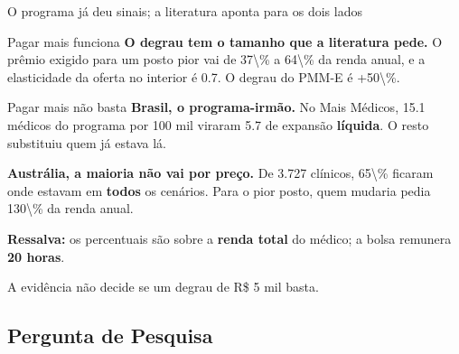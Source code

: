 \documentclass[aspectratio=169,10pt]{beamer}
\begin{document}
\begin{frame}{O programa já deu sinais; a literatura aponta para os dois lados}
{\begin{pmmeduas}
\begin{pmmeparte}{Pagar mais funciona}
        \vspace{0.15em}
        \textbf{O degrau tem o tamanho que a literatura pede.} O prêmio exigido
        para um posto pior vai de \num{37\% a 64\%} da renda anual, e a
        elasticidade da oferta no interior é \num{0,7}. O degrau do PMM-E é
        \num{+50\%}.
      \end{pmmeparte}
      \begin{pmmeparte}{Pagar mais não basta}
        \footnotesize\linespread{0.92}\selectfont
        \textbf{Brasil, o programa-irmão.} No Mais Médicos, \num{+15,1} médicos
        do programa por 100 mil viraram \num{+5,7} de expansão \textbf{líquida}.
        O resto substituiu quem já estava lá.

        \vspace{0.15em}
        \textbf{Austrália, a maioria não vai por preço.} De 3.727 clínicos,
        \num{65\%} ficaram onde estavam em \textbf{todos} os cenários. Para o
        pior posto, quem mudaria pedia \num{130\%} da renda anual.
      \end{pmmeparte}
    \end{pmmeduas}

    \vspace{-0.2em}
    {\footnotesize \textbf{Ressalva:} os percentuais são sobre a \textbf{renda
    total} do médico; a bolsa remunera \textbf{20 horas}.}

    \vspace{-0.1em}
    \begin{destaque}[0.93\textwidth]
      A evidência não decide se um degrau de R\$ 5 mil basta.
    \end{destaque}
  }%

\end{frame}

\subsection{Pergunta de Pesquisa}
\end{document}
